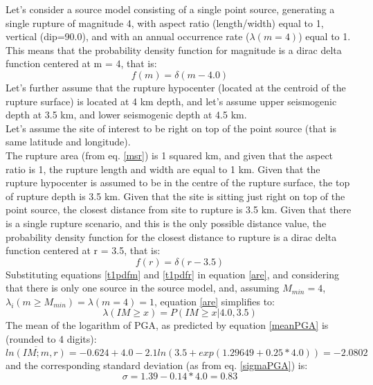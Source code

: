 Let's consider a source model consisting of a single point source, generating 
a single rupture of magnitude 4, with aspect ratio (length/width) equal to 1, 
vertical (dip=90.0), and with an annual occurrence rate ($\lambda(m=4)$) 
equal to 1. 
%
This means that the probability density function for magnitude is a dirac delta
function centered at m = 4, that is: \begin{equation} \label{t1pdfm} f(m) =
\delta(m - 4.0) \end{equation} Let's further assume that the rupture hypocenter
(located at the centroid of the rupture surface) is located at 4 km depth, and
let's assume upper seismogenic depth at 3.5 km, and lower seismogenic depth at
4.5 km.\\ Let's assume the site of interest to be right on top of the point
source (that is same latitude and longitude).\\ The rupture area (from eq.
\ref{msr}) is 1 squared km, and given that the aspect ratio is 1, the rupture
length and width are equal to 1 km. Given that the rupture hypocenter is assumed
to be in the centre of the rupture surface, the top of rupture depth is 3.5 km.
Given that the site is sitting just right on top of the point source, the
closest distance from site to rupture is 3.5 km.  Given that there is a single
rupture scenario, and this is the only possible distance value, the probability
density function for the closest distance to rupture is a dirac delta function
centered at r = 3.5, that is:
\begin{equation}
\label{t1pdfr}
f(r) = \delta(r - 3.5)
\end{equation}
Substituting equations \ref{t1pdfm} and \ref{t1pdfr} in equation \ref{are}, and considering that there is only one source in the source model,
and, assuming $M_{min}=4$,  $\lambda_{i}(m\geq M_{min}) = \lambda(m=4) = 1$, equation \ref{are} simplifies to:
\begin{equation}
\lambda(IM \geq x) = P(IM\geq x | 4.0, 3.5)
\end{equation}
The mean of the logarithm of PGA, as predicted by equation \ref{meanPGA} is (rounded to 4 digits):
\begin{equation}
\overline{ln(IM;m,r)} = -0.624 + 4.0 - 2.1 ln(3.5 + exp(1.29649 + 0.25 * 4.0)) = -2.0802
\end{equation}
and the corresponding standard deviation (as from eq. \ref{sigmaPGA}) is:
\begin{equation}
\sigma = 1.39 - 0.14 * 4.0  = 0.83
\end{equation}

